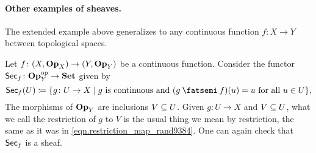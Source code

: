 \documentclass[7Sketches]{subfiles}
\begin{document}
%

\paragraph{Other examples of sheaves.}

The extended example above generalizes to any continuous function $f\colon X\to Y$ between
topological spaces.

\begin{example}%
\label{ex.sheaf_from_cont_function}%
Let $f\colon(X,\Op_X)\to(Y,\Op_Y)$ be a continuous function. Consider the functor $\Fun{Sec}_f\colon\Op_Y\op\to\smset$ given by
\[
\Fun{Sec}_f(U)\coloneqq\{g\colon U\to X\mid g\text{ is continuous and
}(g\cp f)(u)=u\text{ for all }u\in U\},
\]
The morphisms of $\Op_Y$ are inclusions $V\ss U$. Given $g\colon U\to X$ and $V\ss U$, what we call the restriction of $g$ to $V$ is the usual thing we mean by restriction, the same as it was in \cref{eqn.restriction_map_rand9384}. One can again check that $\Fun{Sec}_f$ is a sheaf.
\end{example}
\end{document}
